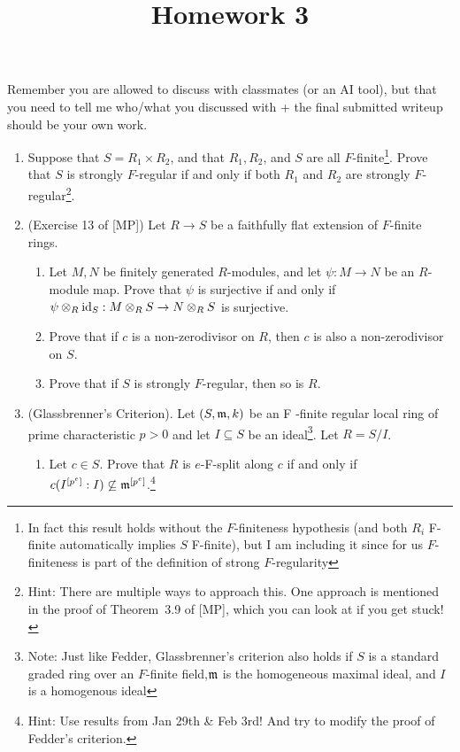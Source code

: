 \documentclass[11pt]{amsart}
\title{Homework 3}
\date{\vspace{-4em}}
\begin{document}
\maketitle\thispagestyle{fancy}

Remember you are allowed to discuss with classmates (or an AI tool), but that you need to tell me who/what you discussed with + the final submitted writeup should be your own work.


\begin{enumerate}[itemsep=7em]
\item Suppose that $S=R_1\times R_2$, and that $R_1,R_2$, and $S$ are all $F$-finite\footnote{In fact this result holds without the $F$-finiteness hypothesis (and both $R_i$ F-finite automatically implies $S$ F-finite), but I am including it since for us $F$-finiteness is part of the definition of strong $F$-regularity}. 
Prove that $S$ is strongly $F$-regular if and only if both $R_1$ and $R_2$ are strongly $F$-regular\footnote{Hint: There are multiple ways to approach this. One approach is mentioned in the proof of Theorem~3.9 of [MP], which you can look at if you get stuck!}.



\item (Exercise 13 of [MP]) Let $R\to S$ be a faithfully flat extension of $F$-finite rings. 
\begin{enumerate}[itemsep=1em]
\item Let $M,N$ be finitely generated $R$-modules, and let $\psi:M\to N$ be an $R$-module map. Prove that $\psi$ is surjective if and only if $\psi\otimes_R \operatorname{id}_S: M\otimes_R S \to N\otimes_R S$ is surjective.


\item Prove that if $c$ is a non-zerodivisor on $R$, then $c$ is also a non-zerodivisor on $S$.

\item Prove that if $S$ is strongly $F$-regular, then so is $R$.

\end{enumerate}


\item (Glassbrenner's Criterion). Let $(S, \mathfrak{m}, k)$ be an F -finite regular local ring of prime
characteristic $p > 0$ and let $I \subseteq S$ be an ideal\footnote{Note: Just like Fedder, Glassbrenner's criterion also holds if $S$ is a standard graded ring over an $F$-finite field,$\mathfrak{m}$ is the homogeneous maximal ideal, and $I$ is a homogenous ideal}. Let $R = S/I$. 
\begin{enumerate}[itemsep=1em]
\item Let $c\in S$. Prove that $R$ is $e$-F-split along $c$ if and only if $c(I^{[p^e]}:I)\not\subseteq \mathfrak{m}^{[p^e]}$.\footnote{Hint: Use results from Jan 29th \& Feb 3rd! And try to modify the proof of Fedder's criterion.}


\end{enumerate}
\end{enumerate}
\end{document}
